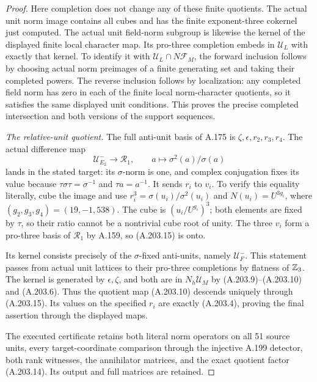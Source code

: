 \begin{proof}
Here completion does not change any of these finite
quotients.  The actual unit norm image contains all
cubes and has the finite exponent-three cokernel just
computed.  The actual unit field-norm subgroup is
likewise the kernel of the displayed finite local
character map.  Its pro-three completion embeds in
\(\mathcal U_L\) with exactly that kernel.  To identify
it with \(\mathcal U_L\cap N\mathcal F_M\), the forward
inclusion follows by choosing actual norm preimages
of a finite generating set and taking their completed
powers.  The reverse inclusion follows by localization:
any completed field norm has zero in each of the finite
local norm-character quotients, so it satisfies the
same displayed unit conditions.  This proves the precise
completed intersection and both versions of the support
sequences.

\emph{The relative-unit quotient.}
The full anti-unit basis of A.175 is
\(\zeta,\epsilon,r_2,r_3,r_4\).
The actual difference map
\[
 \mathcal U_{E_2}^-\longrightarrow\mathcal R_1,
             \qquad a\longmapsto\sigma^2(a)/\sigma(a)
\tag{A.203.15}
\]
lands in the stated target: its \(\sigma\)-norm is
one, and complex conjugation fixes its value because
\(\tau\sigma\tau=\sigma^{-1}\) and \(\tau a=a^{-1}\).
It sends \(r_i\) to \(v_i\).  To verify this equality
literally, cube the image and use
\(r_i^3=\sigma(u_i)/\sigma^2(u_i)\) and
\(N(u_i)=U^{3g_i}\), where
\((g_2,g_3,g_4)=(19,-1,538)\).
The cube is \((u_i/U^{g_i})^3\); both elements are
fixed by \(\tau\), so their ratio cannot be a
nontrivial cube root of unity.
The three \(v_i\) form a pro-three basis of
\(\mathcal R_1\) by A.159, so (A.203.15) is onto.

Its kernel consists precisely of the \(\sigma\)-fixed
anti-units, namely \(\mathcal U_F^-\).
This statement passes from actual unit lattices to
their pro-three completions by flatness of \(\mathbb Z_3\).
The kernel is generated by \(\epsilon,\zeta\), and
both are in \(N_h\mathcal U_M\) by
(A.203.9)--(A.203.10) and (A.203.6).
Thus the quotient map (A.203.10) descends uniquely
through (A.203.15).  Its values on the specified
\(r_i\) are exactly (A.203.4), proving the final
assertion through the displayed maps.

The executed certificate
retains both literal norm operators on all 51 source
units, every target-coordinate comparison through the
injective A.199 detector, both rank witnesses, the
annihilator matrices, and the exact quotient factor
(A.203.14).  Its output and full matrices are retained.
\end{proof}
